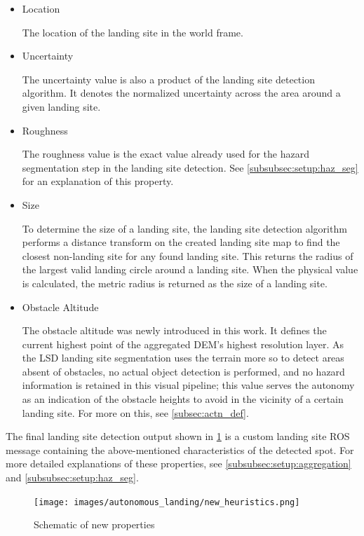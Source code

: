 \begin{itemize}
    \item Location

    The location of the landing site in the world frame.
    \item Uncertainty

    The uncertainty value is also a product of the landing site detection algorithm. It denotes the normalized uncertainty across the area around a given landing site. 
    \item Roughness

    The roughness value is the exact value already used for the hazard segmentation step in the landing site detection. See \cref{subsubsec:setup:haz_seg} for an explanation of this property.
    \item Size

    To determine the size of a landing site, the landing site detection algorithm performs a distance transform on the created landing site map to find the closest non-landing site for any found landing site. This returns the radius of the largest valid landing circle around a landing site. When the physical value is calculated, the metric radius is returned as the size of a landing site.
    \item Obstacle Altitude

    The obstacle altitude was newly introduced in this work. It defines the current highest point of the aggregated DEM's highest resolution layer. As the LSD landing site segmentation uses the terrain more so to detect areas absent of obstacles, no actual object detection is performed, and no hazard information is retained in this visual pipeline; this value serves the autonomy as an indication of the obstacle heights to avoid in the vicinity of a certain landing site. For more on this, see \cref{subsec:actn_def}.
\end{itemize}

The final landing site detection output shown in \cref{fig:new_properties} is a custom landing site ROS message containing the above-mentioned characteristics of the detected spot. For more detailed explanations of these properties, see \cref{subsubsec:setup:aggregation} and \cref{subsubsec:setup:haz_seg}.

\begin{figure}[h]
\centering
\texttt{[image: images/autonomous\_landing/new\_heuristics.png]}
\caption{Schematic of new properties}
\label{fig:new_properties}
\end{figure}

